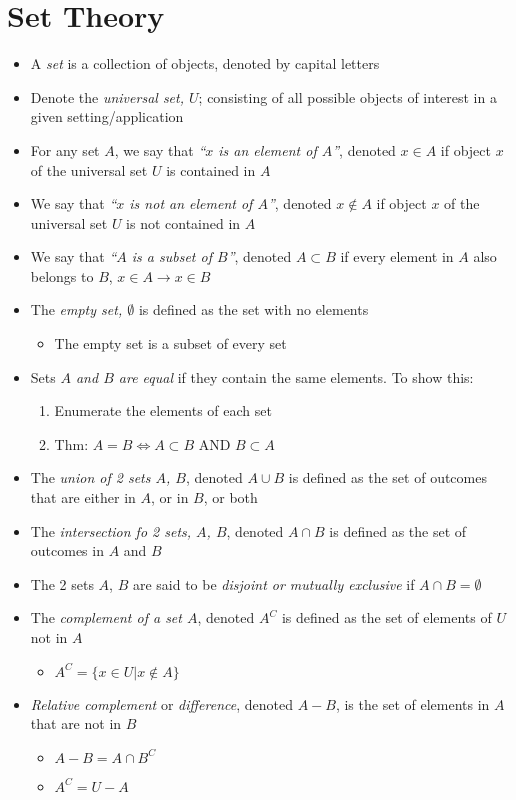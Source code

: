 \section{Set Theory} \label{sec:Set Theory}
\begin{itemize}[noitemsep, nolistsep]
	\item A \emph{set} is a collection of objects, denoted by capital letters
	\item Denote the \emph{universal set, $U$}; consisting of all possible objects of interest in a given setting/application
	\item For any set $A$, we say that \emph{``$x$ is an element of $A$''}, denoted $x \in A$ if object $x$ of the universal set $U$ is contained in $A$
	\item We say that \emph{``$x$ is not an element of $A$''}, denoted $x \notin A$ if object $x$ of the universal set $U$ is not contained in $A$
	\item We say that \emph{``$A$ is a subset of $B$''}, denoted $A \subset B$ if every element in $A$ also belongs to $B$, $x \in A \rightarrow x \in B$
	\item The \emph{empty set, $\emptyset$} is defined as the set with no elements
		\begin{itemize}[noitemsep, nolistsep]
			\item The empty set is a subset of every set
		\end{itemize}
	\item Sets \emph{$A$ and $B$ are equal} if they contain the same elements. To show this:
		\begin{enumerate}
			\item Enumerate the elements of each set
			\item Thm: $A=B \iff A \subset B$ AND $B \subset A$
		\end{enumerate}
	\item The \emph{union of 2 sets $A$, $B$}, denoted $A \cup B$ is defined as the set of outcomes that are either in $A$, or in $B$, or both
	\item The \emph{intersection fo 2 sets, $A$, $B$}, denoted $A \cap B$ is defined as the set of outcomes in $A$ and $B$
	\item The 2 sets $A$, $B$ are said to be \emph{disjoint or mutually exclusive} if $A \cap B = \emptyset$
	\item The \emph{complement of a set $A$}, denoted $A^{C}$ is defined as the set of elements of $U$ not in $A$
		\begin{itemize}[noitemsep, nolistsep]
			\item $A^{C} = \lbrace x \in U \vert x \notin A \rbrace$
		\end{itemize}
	\item \emph{Relative complement} or \emph{difference}, denoted $A-B$, is the set of elements in $A$ that are not in $B$
		\begin{itemize}[noitemsep, nolistsep]
			\item $A-B = A \cap B^{C}$
			\item $A^{C} = U - A$
		\end{itemize}
\end{itemize}

